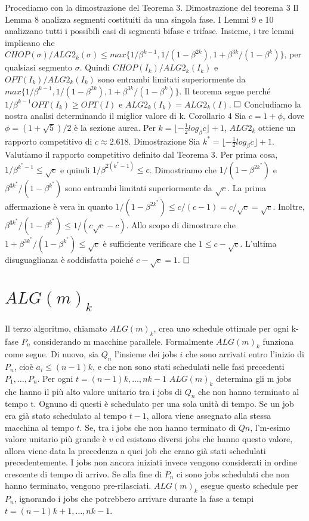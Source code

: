 \documentclass[12pt]{article}
\begin{document}
Procediamo con la dimostrazione del Teorema 3.
Dimostrazione del teorema 3 Il Lemma 8 analizza segmenti costituiti da una singola fase.
I Lemmi 9 e 10 analizzano tutti i possibili casi di segmenti bifase e trifase.
Insieme, i tre lemmi implicano che $CHOP (\sigma) / ALG2_{k} (\sigma) \leq max \{1 / \beta^{k-1}, 1 / (1 -\beta^{2k}), 1 + \beta^{3k} / (1 - \beta^{k} )\}$, per qualsiasi segmento $\sigma$. Quindi $CHOP (I_{k}) / ALG2_{k} (I_{k})$ e $OPT (I_{k}) / ALG2_{k} (I_{k})$ sono entrambi limitati superiormente da $max \{1 / \beta^{k-1}, 1 / (1 - \beta^{2k}), 1 + \beta^{3k} / (1 - \beta^{k})\}$. Il teorema segue perché $1 / \beta^{k-1}OPT(I_{k}) \geq OPT(I)$ e $ALG2_{k} (I_{k}) = ALG2_{k} (I)$. $\hfill \square$
Concludiamo la nostra analisi determinando il miglior valore di k.
Corollario 4
Sia $c = 1 + \phi$, dove $\phi = (1 + \sqrt{5}) / 2$ è la sezione aurea. Per $k = \lfloor -\frac{1}{2} log_{\beta} c \rfloor + 1$, $ALG2_{k}$ ottiene un rapporto competitivo di $c \approx 2.618.$
Dimostrazione
Sia $k^{*}  = \lfloor -\frac{1}{2} log_{\beta} c \rfloor + 1$. Valutiamo il rapporto competitivo definito dal Teorema 3. Per prima cosa, $1 / \beta^{k^{*}-1} \leq \sqrt{c}$ e quindi $1 / \beta^{2 (k^{*}  -1)} \leq c$. Dimostriamo che $1 / (1 - \beta^{2k^{*}})$ e $\beta^{3k^{*}} / (1 - \beta^{k^{*}})$ sono entrambi limitati superiormente da $\sqrt{c}$. La prima affermazione è vera in quanto $1 / (1 - \beta^{2k^{*}}) \leq c / (c - 1) = c / \sqrt{c} = \sqrt{c}$. Inoltre, $\beta^{3k^{*}} / (1 - \beta^{k^{*}}) \leq 1 / (c\sqrt{c} - c)$. Allo scopo di dimostrare che $1 + \beta^{3k^{*}} / (1 - \beta^{k^{*}}) \leq \sqrt{c}$ è sufficiente verificare che $1 \leq c - \sqrt{c}$. L'ultima disuguaglianza è soddisfatta poiché $c - \sqrt{c} = 1$. $\hfill \square$


\section{$ALG(m)_{k}$}
Il terzo algoritmo, chiamato $ALG(m)_{k}$, crea uno schedule ottimale per ogni k-fase $P_{n}$ considerando m macchine parallele. Formalmente $ALG(m)_{k}$ funziona come segue. Di nuovo, sia $Q_{n}$ l’insieme dei jobs $i$ che sono arrivati entro l’inizio di $P_{n}$, cioè $a_{i} \leq (n - 1)k$, e che non sono stati schedulati nelle fasi precedenti $P_{1}, … , P_{n}$. Per ogni $t = (n-1)k, … , nk - 1$ $ALG(m)_{k}$ determina gli m jobs che hanno il più alto valore unitario tra i jobs di $Q_{n}$ che non hanno terminato al tempo t. Ognuno di questi è schedulato per una sola unità di tempo. Se un job era già stato schedulato al tempo $t-1$, allora viene assegnato alla stessa macchina al tempo $t$. Se, tra i jobs che non hanno terminato di $Qn$, l’m-esimo valore unitario più grande è $v$ ed esistono diversi jobs che hanno questo valore, allora viene data la precedenza a quei job che erano già stati schedulati precedentemente. I jobs non ancora iniziati invece vengono considerati in ordine crescente di tempo di arrivo. Se alla fine di $P_{n}$ ci sono jobs schedulati che non hanno terminato, vengono pre-rilasciati. $ALG(m)_{k}$ esegue questo schedule per $P_{n}$, ignorando i jobs che potrebbero arrivare durante la fase a tempi $t = (n-1)k + 1, …, nk - 1$.
\end{document}
